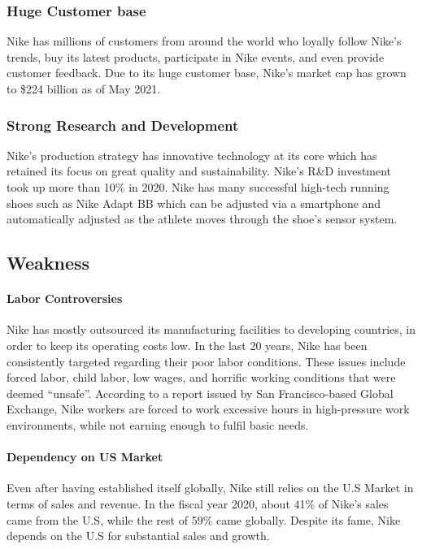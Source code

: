 \documentclass[a4paper, 12pt]{report}
\begin{document}
\subsubsection{Huge Customer base}
Nike has millions of customers from around the world who loyally follow Nike’s trends, buy its latest products, participate in Nike events, and even provide customer feedback. Due to its huge customer base, Nike’s market cap has grown to \$224 billion as of May 2021.
\subsubsection{Strong Research and Development}
Nike's production strategy has innovative technology at its core which has retained its focus on great quality and sustainability. Nike's R&D investment took up more than 10\% in 2020. Nike has many successful high-tech running shoes such as Nike Adapt BB which can be adjusted via a smartphone and automatically adjusted as the athlete moves through the shoe's sensor system.
\subsection{Weakness}

\paragraph{Labor Controversies}
Nike has mostly outsourced its manufacturing facilities to developing countries, in order to keep its operating costs low. In the last 20 years, Nike has been consistently targeted regarding their poor labor conditions. These issues include forced labor, child labor, low wages, and horrific working conditions that were deemed “unsafe”. According to a report issued by San Francisco-based Global Exchange, Nike workers are forced to work excessive hours in high-pressure work environments, while not earning enough to fulfil basic needs.
\paragraph{Dependency on US Market}
Even after having established itself globally, Nike still relies on the U.S Market in terms of sales and revenue. In the fiscal year 2020, about 41\% of Nike’s sales came from the U.S, while the rest of 59\% came globally. Despite its fame, Nike depends on the U.S for substantial sales and growth.
\end{document}

